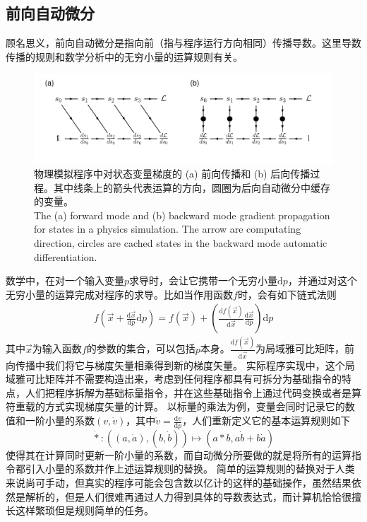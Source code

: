 \documentclass[A4,twoside,UTF8]{ctexart}
\def\D{\mathrm{d}}
\begin{document}
\subsection{前向自动微分}
    顾名思义，前向自动微分是指向前（指与程序运行方向相同）传播导数。这里导数传播的规则和数学分析中的无穷小量的运算规则有关。
    \begin{figure}[t]
        \centering
        \includegraphics[width=0.9\columnwidth,trim={0 0cm 0 0},clip]{fig3.pdf}
        \caption{
            物理模拟程序中对状态变量梯度的 (a) 前向传播和 (b) 后向传播过程。其中线条上的箭头代表运算的方向，圆圈为后向自动微分中缓存的变量。\\
            The (a) forward mode and (b) backward mode gradient propagation for states in a physics simulation.
            The arrow are computating direction, circles are cached states in the backward mode automatic differentiation.
        }\label{fig:autodifftypes}
\end{figure}
数学中，在对一个输入变量$p$求导时，会让它携带一个无穷小量$\D p$，并通过对这个无穷小量的运算完成对程序的求导。比如当作用函数$f$时，会有如下链式法则
\begin{align}
    f\left(\vec x+ \frac{\D \vec x}{\D p} \D p\right) = f(\vec x) + \left(\frac{\D f(\vec x)}{\D \vec x}\frac{\D \vec x}{\D p}\right) \D p
\end{align}
其中$\vec x$为输入函数$f$的参数的集合，可以包括$p$本身。$\frac{\D f(\vec x)}{\D \vec x}$为局域雅可比矩阵，前向传播中我们将它与梯度矢量相乘得到新的梯度矢量。
实际程序实现中，这个局域雅可比矩阵并不需要构造出来，考虑到任何程序都具有可拆分为基础指令的特点，人们把程序拆解为基础标量指令，并在这些基础指令上通过代码变换或者是算符重载的方式实现梯度矢量的计算。
以标量的乘法为例，变量会同时记录它的数值和一阶小量的系数$(v, \dot v)$，其中$\dot v = \frac{\D v}{\D p}$，人们重新定义它的基本运算规则如下
$$\dot{*}: ((a, \dot a), (b, \dot b)) \mapsto (a * b, a \dot b + b \dot a)$$
使得其在计算同时更新一阶小量的系数，而自动微分所要做的就是将所有的运算指令都引入小量的系数并作上述运算规则的替换。
简单的运算规则的替换对于人类来说尚可手动，但真实的程序可能会包含数以亿计的这样的基础操作，虽然结果依然是解析的，但是人们很难再通过人力得到具体的导数表达式，而计算机恰恰很擅长这样繁琐但是规则简单的任务。
\end{document}
